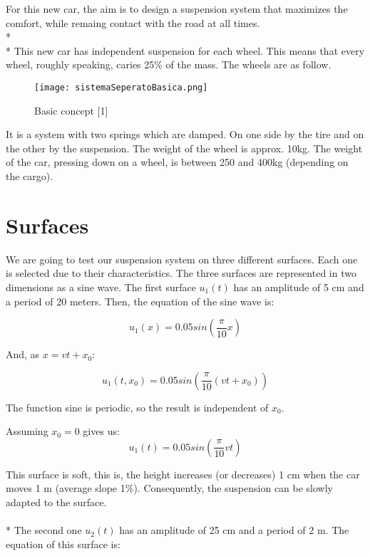 \documentclass[a4paper]{article}
\begin{document}
For this new car, the aim is to design a suspension system that maximizes the comfort,
while remaing contact with the road at all times.
\\*
\\*
This new car has independent suspension for each wheel.
This means that every wheel, roughly speaking, caries 25\% of the mass.
The wheels are as follow.

\begin{figure}[H]
\centering
\texttt{[image: sistemaSeperatoBasica.png]}
\caption{\label{fig:basicConstructionWheel}Basic concept [1]}
\end{figure}
It is a system with two springs which are damped.
On one side by the tire and on the other by the suspension.
The weight of the wheel is approx. 10kg.
The weight of the car, pressing down on a wheel, is between 250 and 400kg (depending on the cargo).


\newpage


\section{Surfaces}

We are going to test our suspension system on three different surfaces.
Each one is selected due to their characteristics.
The three surfaces are represented in two dimensions as a sine wave.
The first surface $u_1(t)$ has an amplitude of 5 cm and a period of 20 meters.
Then, the equation of the sine wave is:

\begin{equation}
u_1(x)=0.05sin(\frac{\pi}{10}x)
\end{equation}

And, as $x=v t+x_0$:

\begin{equation}
u_1(t,x_0)=0.05sin(\frac{\pi}{10}(v t+x_0))
\end{equation}

The function sine is periodic, so the result is independent of $x_0$.

Assuming $x_0=0$ gives us:
\begin{equation}
u_1(t)=0.05sin(\frac{\pi}{10}v t)
\end{equation}

This surface is soft, this is, the height increases (or decreases) 1 cm when the car moves 1 m (average slope 1\%).
Consequently, the suspension can be slowly adapted to the surface.
\\
\\*
The second one $u_2(t)$ has an amplitude of 25 cm and a period of 2 m.
The equation of this surface is:
\end{document}
